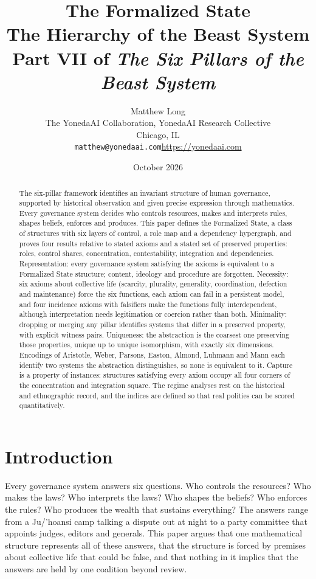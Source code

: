 \documentclass[11pt,letterpaper]{article}
\title{The Formalized State\\[2pt]
  {\large The Hierarchy of the Beast System}\\[4pt]
  {\normalsize Part VII of \emph{The Six Pillars of the Beast System}}}
\author{Matthew Long\\
  \small The YonedaAI Collaboration, YonedaAI Research Collective\\
  \small Chicago, IL\\
  \small \texttt{matthew@yonedaai.com}\quad \url{https://yonedaai.com}}
\date{October 2026}
\theoremstyle{definition}
\theoremstyle{remark}
\begin{document}
\maketitle

\begin{abstract}
The six-pillar framework identifies an invariant structure of human governance, supported by historical observation and given precise expression through mathematics. Every governance system decides who controls resources, makes and interprets rules, shapes beliefs, enforces and produces. This paper defines the Formalized State, a class of structures with six layers of control, a role map and a dependency hypergraph, and proves four results relative to stated axioms and a stated set of preserved properties: roles, control shares, concentration, contestability, integration and dependencies. Representation: every governance system satisfying the axioms is equivalent to a Formalized State structure; content, ideology and procedure are forgotten. Necessity: six axioms about collective life (scarcity, plurality, generality, coordination, defection and maintenance) force the six functions, each axiom can fail in a persistent model, and four incidence axioms with falsifiers make the functions fully interdependent, although interpretation needs legitimation or coercion rather than both. Minimality: dropping or merging any pillar identifies systems that differ in a preserved property, with explicit witness pairs. Uniqueness: the abstraction is the coarsest one preserving those properties, unique up to unique isomorphism, with exactly six dimensions. Encodings of Aristotle, Weber, Parsons, Easton, Almond, Luhmann and Mann each identify two systems the abstraction distinguishes, so none is equivalent to it. Capture is a property of instances: structures satisfying every axiom occupy all four corners of the concentration and integration square. The regime analyses rest on the historical and ethnographic record, and the indices are defined so that real polities can be scored quantitatively.
\end{abstract}

\section{Introduction}
\label{sec:intro}

Every governance system answers six questions. Who controls the resources? Who makes the laws? Who interprets the laws? Who shapes the beliefs? Who enforces the rules? Who produces the wealth that sustains everything? The answers range from a Ju/'hoansi camp talking a dispute out at night to a party committee that appoints judges, editors and generals. This paper argues that one mathematical structure represents all of these answers, that the structure is forced by premises about collective life that could be false, and that nothing in it implies that the answers are held by one coalition beyond review.
\end{document}
